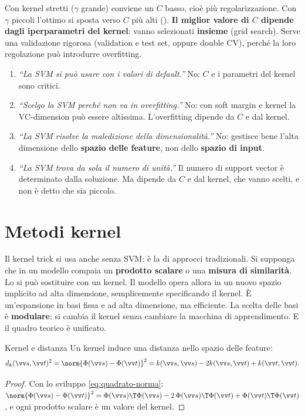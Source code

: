 Con kernel stretti ($\gamma$ grande) conviene un $C$ basso, cioè più regolarizzazione. Con $\gamma$ piccoli l'ottimo
si sposta verso $C$ più alti (). \textbf{Il miglior valore di $C$ dipende dagli
iperparametri del kernel}: vanno selezionati \textbf{insieme} (grid search). Serve una validazione rigorosa
(validation e test set, oppure double CV), perché la loro regolazione può introdurre overfitting.

\begin{attenzione}
\begin{enumerate}
  \item \emph{``La SVM si può usare con i valori di default.''} No: $C$ e i parametri del kernel sono critici.
  \item \emph{``Scelgo la SVM perché non va in overfitting.''} No: con soft margin e kernel la VC-dimension può essere
        altissima. L'overfitting dipende da $C$ e dal kernel.
  \item \emph{``La SVM risolve la maledizione della dimensionalità.''} No: gestisce bene l'alta dimensione dello
        \textbf{spazio delle feature}, non dello \textbf{spazio di input}.
  \item \emph{``La SVM trova da sola il numero di unità.''} Il numero di support vector è determinato dalla
        soluzione. Ma dipende da $C$ e dal kernel, che vanno scelti, e non è detto che sia piccolo.
\end{enumerate}
\end{attenzione}

\section{Metodi kernel}
\label{sec:metodi-kernel}

Il kernel trick si usa anche senza SVM: è la  di approcci tradizionali. Si supponga che in
un modello compaia un \textbf{prodotto scalare} o una \textbf{misura di similarità}. Lo si può sostituire con un
kernel. Il modello opera allora in un nuovo spazio implicito ad alta dimensione, semplicemente specificando il
kernel. È un'espansione in basi fissa e ad alta dimensione, ma efficiente. La scelta delle basi è
\textbf{modulare}: si cambia il kernel senza cambiare la macchina di apprendimento. E il quadro teorico è unificato.

\begin{proprieta}{Kernel e distanza}
Un kernel induce una distanza nello spazio delle feature:
\[
d_k(\vv s,\vv t)^2 = \norm{\Phi(\vv s)-\Phi(\vv t)}^2 = k(\vv s,\vv s) - 2k(\vv s,\vv t) + k(\vv t,\vv t).
\]
\end{proprieta}
\begin{proof}
Con lo sviluppo \eqref{eq:quadrato-norma}:
$\norm{\Phi(\vv s)-\Phi(\vv t)}^2 = \Phi(\vv s)\T\Phi(\vv s) - 2\,\Phi(\vv s)\T\Phi(\vv t) + \Phi(\vv t)\T\Phi(\vv t)$, e
ogni prodotto scalare è un valore del kernel.
\end{proof}

